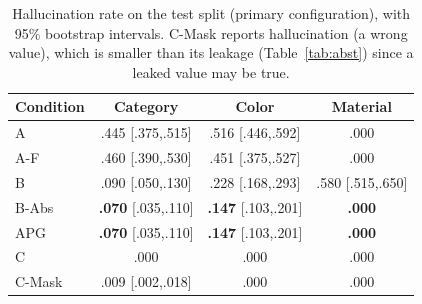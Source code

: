 \documentclass[runningheads]{llncs}
\newcommand{\cond}[1]{\textsf{#1}}
\begin{document}
\begin{table}[!htb]
\caption{Hallucination rate on the test split (primary configuration), with 95\% bootstrap intervals. \cond{C-Mask} reports hallucination (a wrong value), which is smaller than its leakage (Table~\ref{tab:abst}) since a leaked value may be true.}
\label{tab:main}
\centering
\footnotesize
\setlength{\tabcolsep}{4pt}
\begin{tabular}{@{}lccc@{}}
\toprule
Condition & Category & Color & Material \\
\midrule
\cond{A} & .445 {\scriptsize[.375,.515]} & .516 {\scriptsize[.446,.592]} & .000 \\
\cond{A-F} & .460 {\scriptsize[.390,.530]} & .451 {\scriptsize[.375,.527]} & .000 \\
\cond{B} & .090 {\scriptsize[.050,.130]} & .228 {\scriptsize[.168,.293]} & .580 {\scriptsize[.515,.650]} \\
\cond{B-Abs} & \textbf{.070} {\scriptsize[.035,.110]} & \textbf{.147} {\scriptsize[.103,.201]} & \textbf{.000} \\
\cond{APG} & \textbf{.070} {\scriptsize[.035,.110]} & \textbf{.147} {\scriptsize[.103,.201]} & \textbf{.000} \\
\cond{C} & .000 & .000 & .000 \\
\cond{C-Mask} & .009 {\scriptsize[.002,.018]} & .000 & .000 \\
\bottomrule
\end{tabular}
\end{table}
\end{document}

